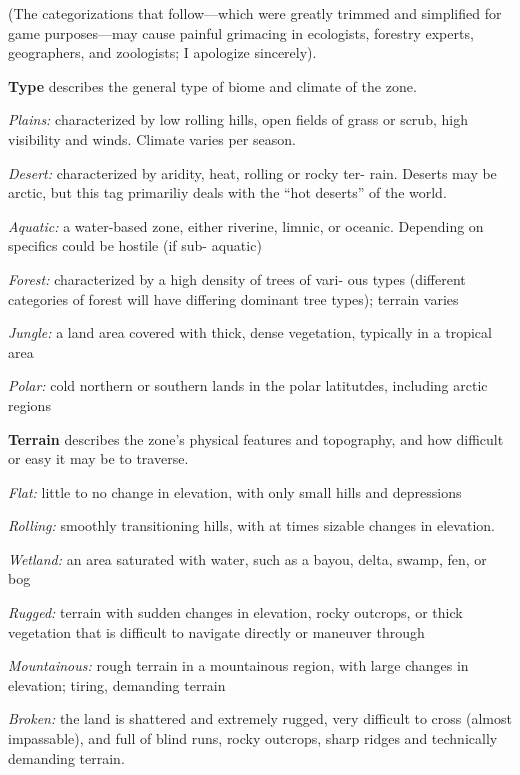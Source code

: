 \documentclass[oneside,10pt]{article}
\begin{document}
\begin{multicols}{2}
(The categorizations that follow—which were greatly trimmed
and simplified for game purposes—may cause painful grimacing in ecologists, forestry experts, geographers, and zoologists; I apologize sincerely).

\textbf{Type} describes the general type of biome and climate of the 
zone. 
\begin{adjustwidth*}{.5cm}{.5cm}

\textit{Plains:} characterized by low rolling hills, open fields of 
grass or scrub, high visibility and winds. Climate varies per 
season. 

\textit{Desert:} characterized by aridity, heat, rolling or rocky ter- 
rain. Deserts may be arctic, but this tag primariliy deals 
with the “hot deserts” of the world. 

    \textit{Aquatic:} a water-based zone, either riverine, limnic, or 
    oceanic. Depending on specifics could be hostile (if sub- 
    aquatic) 

    \textit{Forest:} characterized by a high density of trees of vari- 
    ous types (different categories of forest will have differing 
    dominant tree types); terrain varies 

    \textit{Jungle:} a land area covered with thick, dense vegetation, 
    typically in a tropical area 

\textit{Polar:} cold northern or southern lands in the polar latitutdes, including arctic regions
\end{adjustwidth*}

\textbf{Terrain} describes the zone’s physical features and topography, and how difficult or easy it may be to traverse.
\begin{adjustwidth*}{.5cm}{.5cm}

\textit{Flat:} little to no change in elevation, with only small hills
and depressions

\textit{Rolling:} smoothly transitioning hills, with at times sizable
changes in elevation.

\textit{Wetland:} an area saturated with water, such as a bayou,
delta, swamp, fen, or bog

\textit{Rugged:} terrain with sudden changes in elevation, rocky
outcrops, or thick vegetation that is difficult to navigate
directly or maneuver through

\textit{Mountainous:} rough terrain in a mountainous region, with
large changes in elevation; tiring, demanding terrain

\textit{Broken:} the land is shattered and extremely rugged, very
difficult to cross (almost impassable), and full of blind runs,
rocky outcrops, sharp ridges and technically demanding
terrain.


\end{adjustwidth*}
\end{multicols}
\end{document}
